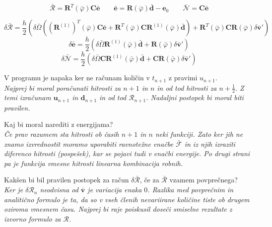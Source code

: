 \documentclass{article}
\newcommand{\dep}[1]{{\scriptstyle(#1)}}
\begin{document}
$$\bar{\mathcal{R}} = \mathbf{R}^T\dep{\bar{\varphi}}\mathbf{C}\bar{\mathbf{e}}  \qquad \bar{\mathbf{e}} = \mathbf{R}\dep{\bar{\varphi}}\bar{\mathbf{d}}-\mathbf{e}_0 \qquad \bar{\mathcal{N}} = \mathbf{C}\bar{\mathbf{e}}  $$

$$\delta \bar{\mathcal{R}} = \frac{h}{2} (\delta\bar{\Omega}((\mathbf{R}^{(1)})^T\dep{\bar{\varphi}}\mathbf{C}\bar{\mathbf{e}} + \mathbf{R}^T\dep{\bar{\varphi}}\mathbf{CR}^{(1)}\dep{\bar{\varphi}}\bar{\mathbf{d}}) + \mathbf{R}^T\dep{\bar{\varphi}} \mathbf{CR}\dep{\bar{\varphi}}\delta\bar{\mathbf{v}}' )$$
$$\delta\bar{\mathbf{e}} = \frac{h}{2}(\delta\bar{\Omega}\mathbf{R}^{(1)}\dep{\bar{\varphi}}\bar{\mathbf{d}} + \mathbf{R}\dep{\bar{\varphi}}\delta\bar{\mathbf{v}}')$$
$$\delta\bar{\mathcal{N}} = \frac{h}{2} (\delta\bar{\Omega}\mathbf{CR}^{(1)}\dep{\bar{\varphi}}\bar{\mathbf{d}} + \mathbf{CR}\dep{\bar{\varphi}}\delta\bar{\mathbf{v}}')$$


V programu je napaka ker ne računam količin v $t_{n+1}$ z pravimi $u_{n+1}$.\\
{\it Najprej bi moral poračunati hitrosti za $n+1$ in $n$ in od tod hitrosti za $n+\frac{1}{2}$. Z temi izračunam $\mathbf{u}_{n+1}$ in $\mathbf{d}_{n+1}$ in od tod $\mathcal{R}_{n+1}$. Nadaljni postopek bi moral biti pravilen.}

Kaj bi moral narediti z energijama?\\
{\it Če prav razumem sta hitrosti ob časih $n+1$ in $n$ neki funkciji. Zato ker jih ne znamo izvrednostit moramo uporabiti ravnotežne enačbe $\bar{\mathcal{F}}$ in iz njih izraziti diferenco hitrosti (pospešek), kar se pojavi tudi v enačbi energije. Po drugi strani pa je funkcija vmesne hitrosti linearna kombinacija robnih.}

Kakšen bi bil pravilen postopek za račun $\delta\bar{\mathcal{R}}$, če za $\bar{\mathcal{R}}$ vzamem povprečnega?\\
{\it Ker je $\delta\mathcal{R}_n$ neodvisna od $\bar{\mathbf{v}}$ je variacija enaka $0$. Razlika med povprečnim in analitično formulo je ta, da so v vseh členih nevariirane količine tiste ob drugem oziroma vmesnem času. Najprej bi raje poiskusil doseči smiselne rezultate z izvorno formulo za $\mathcal{R}$.}
\end{document}
